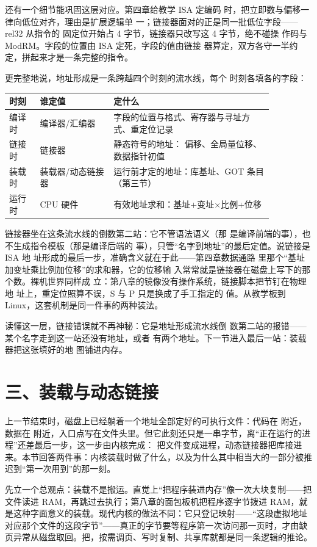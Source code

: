 还有一个细节能巩固这层对应。第四章给教学 ISA 定编码
时，把立即数与偏移一律向低位对齐，理由是扩展逻辑单
一；链接器面对的正是同一批低位字段——rel32 从指令的
固定位开始占 4 字节，链接器只改写这 4 字节，绝不碰操
作码与 ModRM。字段的位置由 ISA 定死，字段的值由链接
器算定，双方各守一半约定，拼起来才是一条完整的指令。

更完整地说，地址形成是一条跨越四个时刻的流水线，每个
时刻各填各的字段：

\begin{longtable}{L{0.1\linewidth}L{0.24\linewidth}L{0.52\linewidth}}
\toprule
时刻 & 谁定值 & 定什么 \\
\midrule
编译时 & 编译器/汇编器 & 字段的位置与格式、寄存器与寻址方式、重定位记录 \\
链接时 & 链接器 & 静态符号的地址： 偏移、全局量位移、数据指针初值 \\
装载时 & 装载器/动态链接器 & 运行前才定的地址：库基址、GOT 条目（第三节） \\
运行时 & CPU 硬件 & 有效地址求和：基址+变址×比例+位移 \\
\bottomrule
\end{longtable}

链接器坐在这条流水线的倒数第二站：它不管语法语义（那
是编译前端的事），也不生成指令模板（那是编译后端的
事），只管“名字到地址”的最后定值。说链接是 ISA 地
址形成的最后一步，准确含义就在于此——第四章数据通路
里那个“基址加变址乘比例加位移”的求和器，它的位移输
入常常就是链接器在磁盘上写下的那个数。裸机世界同样成
立：第八章的镜像没有操作系统，链接脚本把节钉在物理地
址上，重定位照算不误，S 与 P 只是换成了手工指定的
值。从教学板到 Linux，这套机制是同一件事的两种装法。

读懂这一层，链接错误就不再神秘：它是地址形成流水线倒
数第二站的报错——某个名字走到这一站还没有地址，或者
有两个地址。下一节进入最后一站：装载器把这张填好的地
图铺进内存。

\section{三、装载与动态链接}

上一节结束时，磁盘上已经躺着一个地址全部定好的可执行文件：代码在  附近，数据在  附近，入口点写在文件头里。但它此刻还只是一串字节，离“正在运行的进程”还差最后一步，这一步由内核完成： 把文件变成进程，动态链接器把库接进来。本节回答两件事：内核装载时做了什么，以及为什么其中相当大的一部分被推迟到“第一次用到”的那一刻。

先立一个总观点：装载不是搬运。直觉上“把程序装进内存”像一次大块复制——把文件读进 RAM，再跳过去执行；第八章的面包板机把程序逐字节拨进 RAM，就是这种字面意义的装载。现代内核的做法不同：它只登记映射——“这段虚拟地址对应那个文件的这段字节”——真正的字节要等程序第一次访问那一页时，才由缺页异常从磁盘取回。把，按需调页、写时复制、共享库就都是同一条逻辑的推论。

